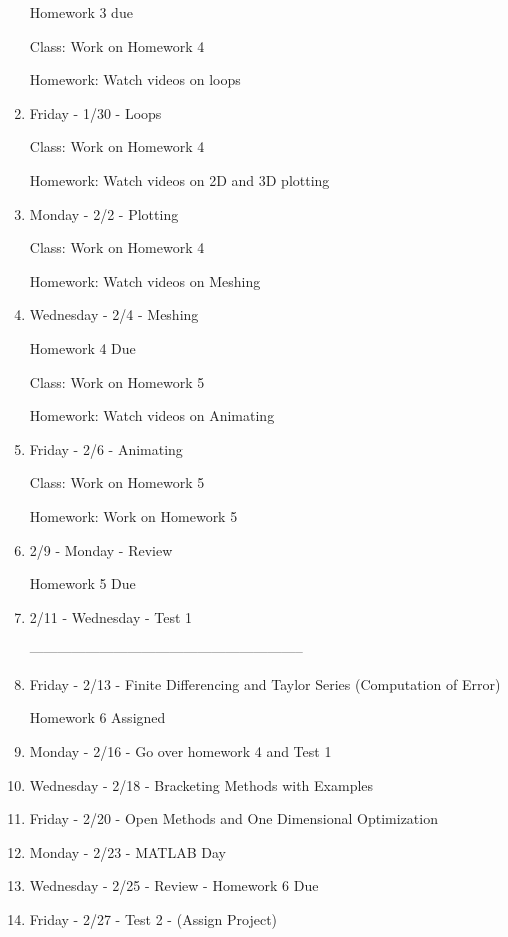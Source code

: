 \begin{enumerate}
  Homework 3 due

  Class: Work on Homework 4

  Homework: Watch videos on loops

\item Friday - 1/30 - Loops

  Class: Work on Homework 4

  Homework: Watch videos on 2D and 3D plotting

\item Monday - 2/2 - Plotting 

  Class: Work on Homework 4

  Homework: Watch videos on Meshing

\item Wednesday - 2/4 - Meshing

  Homework 4 Due

  Class: Work on Homework 5
  
  Homework: Watch videos on Animating

\item Friday - 2/6 - Animating

  Class: Work on Homework 5

  Homework: Work on Homework 5

\item 2/9 - Monday - Review
  
  Homework 5 Due

\item 2/11 - Wednesday - Test 1

-----------------------------------------------------------

\item Friday - 2/13 - Finite Differencing and Taylor Series (Computation of Error)

  Homework 6 Assigned 

\item Monday - 2/16 - Go over homework 4 and Test 1

\item Wednesday - 2/18 - Bracketing Methods with Examples

\item Friday - 2/20 - Open Methods and One Dimensional Optimization

\item Monday - 2/23 - MATLAB Day 

\item Wednesday - 2/25 - Review - Homework 6 Due

\item Friday - 2/27 - Test 2 - (Assign Project)


\end{enumerate}
